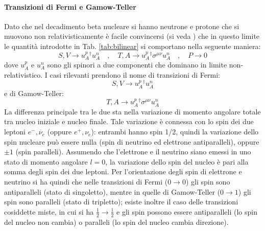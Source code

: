 \documentclass{subnucbo}
\begin{document}
\paragraph{Transizioni di Fermi e Gamow-Teller} Dato che nel decadimento beta nucleare si hanno neutrone e protone che si muovono non relativisticamente è facile convincersi (si veda \cite{ref:greiner}) che in questo limite le quantità introdotte in Tab. \ref{tab:bilinear} si comportano nella seguente maniera:
\begin{equation}
        S , V \rightarrow u_{A}^{p} ^ { \dagger } u_{A}^ { n  } \quad , \quad T , A \rightarrow u_{A} ^ { p } ^ { \dagger } \sigma^{\mu\nu} u_{A} ^ {n } \quad , \quad P \rightarrow 0
\end{equation}
dove $u_{A}^{p}$ e $u_{A}^{n}$ sono gli spinori a due componenti che dominano in limite non-relativistico. I casi rilevanti prendono il nome di transizioni di Fermi:
\begin{equation}
        S , V \rightarrow u_{A} ^ {p } ^ { \dagger } u_{A} ^ { n  }
        \label{eq:sv_app}
\end{equation}
e di Gamow-Teller:
\begin{equation}
        T , A \rightarrow u _{A}^ { p } ^ { \dagger } \sigma^{\mu\nu} u _{A} ^{ n  }
        \label{eq:ta_app}
\end{equation}
La differenza principale tra le due sta nella variazione di momento angolare totale tra nucleo iniziale e nucleo finale. Tale variazione è connessa con lo spin dei due leptoni $e ^ { - } , \overline { \nu } _ { e }$ (oppure $e^{+}, \nu_{e}$): entrambi hanno spin 1/2, quindi la variazione dello spin nucleare può essere nulla (spin di neutrino ed elettrone antiparalleli), oppure $\pm1$ (spin paralleli). Assumendo che l'elettrone e il neutrino siano emessi in uno stato di momento angolare $l=0$, la variazione dello spin del nucleo è pari alla somma degli spin dei due leptoni. Per l'orientazione degli spin di elettrone e neutrino si ha quindi che nelle transizioni di Fermi ($0 \rightarrow 0$) gli spin sono antiparalleli (stato di singoletto), mentre in quelle di Gamow-Teller ($0 \rightarrow 1$) gli spin sono paralleli (stato di tripletto); esiste inoltre il caso delle transizioni cosiddette miste, in cui si ha $\frac{1}{2} \rightarrow \frac{1}{2}$ e gli spin possono essere antiparalleli (lo spin del nucleo non cambia) o paralleli (lo spin del nucleo cambia direzione).\\
\end{document}
